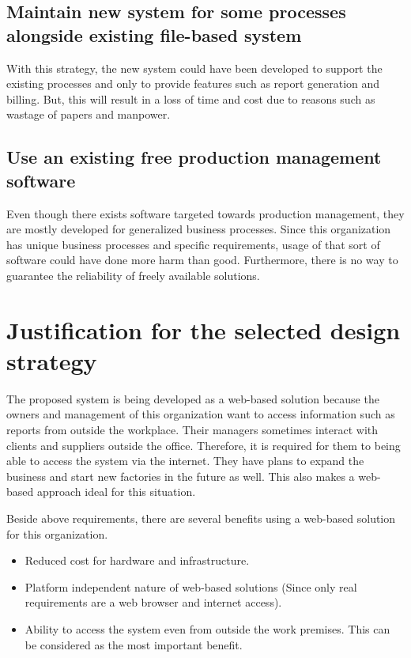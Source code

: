 \documentclass[12pt]{report}
\begin{document}
\subsection{Maintain new system for some processes alongside existing file-based system}
With this strategy, the new system could have been developed to support the existing processes and only to provide features such as report generation and billing. But, this will result in a loss of time and cost due to reasons such as wastage of papers and manpower.

\subsection{Use an existing free production management software}
Even though there exists software targeted towards production management, they are mostly developed for generalized business processes. Since this organization has unique business processes and specific requirements, usage of that sort of software could have done more harm than good. Furthermore, there is no way to guarantee the reliability of freely available solutions.

\section{Justification for the selected design strategy}
The proposed system is being developed as a web-based solution because the owners and management of this organization want to access information such as reports from outside the workplace. Their managers sometimes interact with clients and suppliers outside the office. Therefore, it is required for them to being able to access the system via the internet. They have plans to expand the business and start new factories in the future as well. This also makes a web-based approach ideal for this situation.

Beside above requirements, there are several benefits using a web-based solution for this organization.

\begin{itemize}
	\item Reduced cost for hardware and infrastructure.

	\item Platform independent nature of web-based solutions (Since only real requirements are a web browser and internet access).

	\item Ability to access the system even from outside the work premises. This can be considered as the most important benefit.
\end{itemize}
\end{document}
